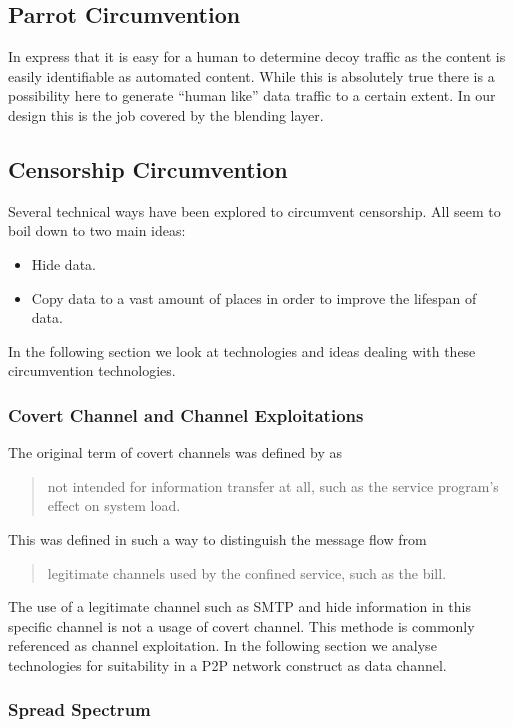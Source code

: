 \subsection{Parrot Circumvention}
In \cite{oakland2013-parrot} \citeauthor{oakland2013-parrot} express that it is easy for a human to determine decoy traffic as the content is easily identifiable as automated content. While this is absolutely true there is a possibility here to generate ``human like'' data traffic to a certain extent. In our design this is the job covered by the blending layer.

\subsection{Censorship Circumvention}
Several technical ways have been explored to circumvent censorship. All seem to boil down to two main ideas:
\begin{itemize}
	\item Hide data.
	\item Copy data to a vast amount of places in order to improve the lifespan of data.
\end{itemize}

In the following section we look at technologies and ideas dealing with these circumvention technologies.

\subsubsection{Covert Channel and Channel Exploitations}
The original term of covert channels was defined by \citeauthor{Lampson73anote}\cite{Lampson73anote} as 
\begin{quote}
	not intended for information transfer at all, such as the service program's effect on system load.
\end{quote}

This was defined  in such a way to distinguish the message flow from 
\begin{quote}
	legitimate channels used by the confined service, such as the bill.
\end{quote}

The use of a legitimate channel such as SMTP and hide information in this specific channel is not a usage of covert channel. This methode is commonly referenced as channel exploitation. In the following section we analyse technologies for suitability in a P2P network construct as data channel.

\subsubsection{Spread Spectrum}

